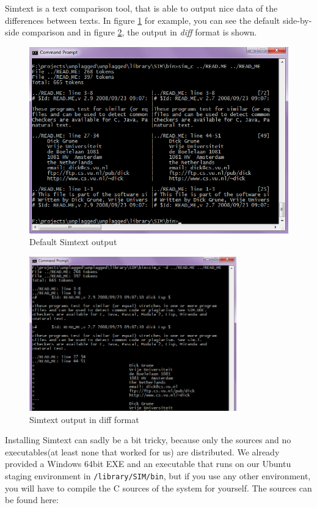 Simtext is a text comparison tool, that is able to output nice data of the differences between texts. In figure 
\ref{fig:simtextOutput} for example, you can see the default side-by-side comparison and in figure \ref{fig:simtextDiff}, 
the output in \textit{diff} format is shown.

\begin{figure}[htbp]
  \centering
    \includegraphics[width=\textwidth]{images/simtext-output.png}
  \caption{Default Simtext output}
  \label{fig:simtextOutput}
\end{figure}

\begin{figure}[htbp]
  \centering
    \includegraphics[width=0.8\textwidth]{images/simtext-output-diff.png}
  \caption{Simtext output in diff format}
  \label{fig:simtextDiff}
\end{figure}

Installing Simtext can sadly be a bit tricky, because only the sources and no executables(at least none that worked for us) 
are distributed. We already
provided a Windows 64bit EXE and an executable that runs on our Ubuntu staging environment in \texttt{/library/SIM/bin}, 
but if you use any other environment, you will have to compile the C sources of the system for yourself. The sources can
be found here:

